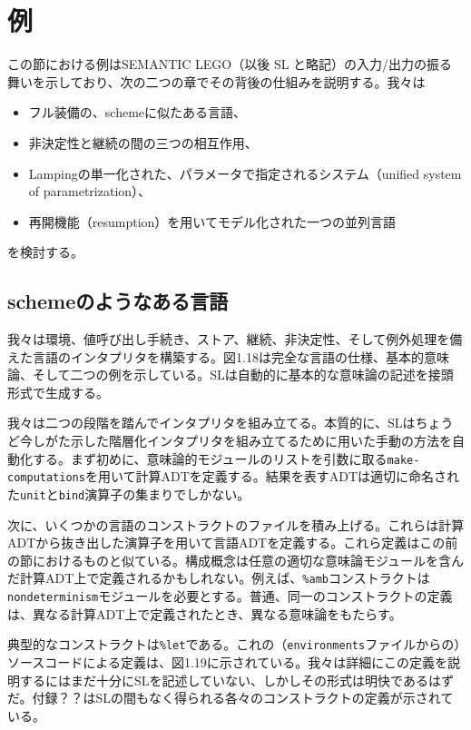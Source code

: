 \documentclass[11pt, oneside]{jsbook}   	%
\begin{document}
\section{例}
この節における例はSEMANTIC LEGO（以後 SL と略記）の入力/出力の振る舞いを示しており、次の二つの章でその背後の仕組みを説明する。我々は
\begin{itemize}
\item フル装備の、schemeに似たある言語、
\item 非決定性と継続の間の三つの相互作用、
\item Lampingの単一化された、パラメータで指定されるシステム（unified system of parametrization）、
\item 再開機能（resumption）を用いてモデル化された一つの並列言語
\end{itemize}
を検討する。

\newpage

\newpage

\newpage

\subsection{schemeのようなある言語}
我々は環境、値呼び出し手続き、ストア、継続、非決定性、そして例外処理を備えた言語のインタプリタを構築する。図1.18は完全な言語の仕様、基本的意味論、そして二つの例を示している。SLは自動的に基本的な意味論の記述を接頭形式で生成する。

我々は二つの段階を踏んでインタプリタを組み立てる。本質的に、SLはちょうど今しがた示した階層化インタプリタを組み立てるために用いた手動の方法を自動化する。まず初めに、意味論的モジュールのリストを引数に取る\verb|make-computations|を用いて計算ADTを定義する。結果を表すADTは適切に命名された\verb|unit|と\verb|bind|演算子の集まりでしかない。

次に、いくつかの言語のコンストラクトのファイルを積み上げる。これらは計算ADTから抜き出した演算子を用いて言語ADTを定義する。これら定義はこの前の節におけるものと似ている。構成概念は任意の適切な意味論モジュールを含んだ計算ADT上で定義されるかもしれない。例えば、\verb|%amb|コンストラクトは\verb|nondeterminism|モジュールを必要とする。普通、同一のコンストラクトの定義は、異なる計算ADT上で定義されたとき、異なる意味論をもたらす。

典型的なコンストラクトは\verb|%let|である。これの（\verb|environments|ファイルからの）ソースコードによる定義は、図1.19に示されている。我々は詳細にこの定義を説明するにはまだ十分にSLを記述していない、しかしその形式は明快であるはずだ。付録？？はSLの間もなく得られる各々のコンストラクトの定義が示されている。
\end{document}
